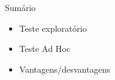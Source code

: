
\begin{frame}{Sumário}
    \begin{itemize}
        \item Teste exploratório
        \item Teste Ad Hoc
        \item Vantagens/desvantagens
    \end{itemize}
\end{frame}